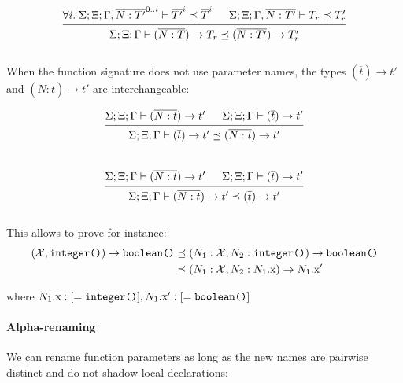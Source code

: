 \documentclass[12pt]{article}
\newcommand{\tx}{\text{\rm x}}
\newcommand{\BX}{\ensuremath{\mathcal{X}}}
\newcommand{\Gammatop}{\ensuremath{\Xi}}
\newcommand{\Gammabot}{\ensuremath{\Gamma}}
\begin{document}
\[
    \begin{prooftree}
        \hypo { \forall i. \; \Sigma; \Gammatop; \Gammabot, \overline{N : T'}^{0..i} \vdash \overline{T'}^{i} \preceq  \overline{T}^{i} }
        \hypo{ \Sigma; \Gammatop; \Gammabot, \overline{N : T'} \vdash T_r \preceq T_r' }
        \infer2{ \Sigma; \Gammatop; \Gammabot \vdash (\overline{N : T}) \rightarrow T_r \preceq (\overline{N : T'}) \rightarrow T_r' }
    \end{prooftree}
\] \\

When the function signature does not use parameter names, the types
$(\overline{t}) \rightarrow t'$ and $(\overline{N : t}) \rightarrow t'$
are interchangeable:


\[
    \begin{prooftree}
        \hypo{ \Sigma; \Gammatop; \Gammabot \vdash (\overline{N : t }) \rightarrow t' }
        \hypo{ \Sigma; \Gammatop; \Gammabot \vdash (\overline{t}) \rightarrow t'}
        \infer2{ \Sigma; \Gammatop; \Gammabot \vdash (\overline{t}) \rightarrow t' \preceq (\overline{N : t }) \rightarrow t' }
    \end{prooftree}
\] \\
\[
    \begin{prooftree}
        \hypo{ \Sigma; \Gammatop; \Gammabot \vdash (\overline{N : t }) \rightarrow t' }
        \hypo{ \Sigma; \Gammatop; \Gammabot \vdash (\overline{t}) \rightarrow t'}
        \infer2{ \Sigma; \Gammatop; \Gammabot \vdash (\overline{N : t }) \rightarrow t' \preceq (\overline{t}) \rightarrow t'  }
    \end{prooftree}
\] \\

This allows to prove for instance:
\begin{align*}
    (\BX, \texttt{integer()}) \rightarrow \texttt{boolean()} & \preceq (N_1: \BX, N_2: \texttt{integer()}) \rightarrow \texttt{boolean()} \\
                                                             & \preceq (N_1 : \BX, N_2 : N_1.\tx) \rightarrow N_1.\tx'
\end{align*}

where $N_1.\tx : [= \texttt{integer()}], N_1.\tx' : [= \texttt{boolean()}]$ \\

\paragraph{Alpha-renaming} We can rename function parameters as long as the
new names are pairwise distinct and do not shadow local declarations:
\end{document}
